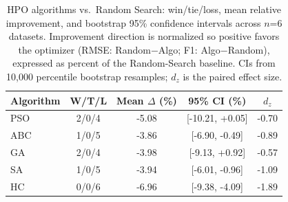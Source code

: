 \begin{table}[!t]
\centering
\caption{HPO algorithms vs.\ Random Search: win/tie/loss, mean relative improvement, and bootstrap 95\% confidence intervals across $n$=6 datasets. Improvement direction is normalized so positive favors the optimizer (RMSE: Random$-$Algo; F1: Algo$-$Random), expressed as percent of the Random-Search baseline. CIs from 10{,}000 percentile bootstrap resamples; $d_z$ is the paired effect size.}
\label{tab:ci_comparison}
\small
\begin{tabular}{lcccc}
\toprule
\textbf{Algorithm} & \textbf{W/T/L} & \textbf{Mean $\Delta$ (\%)} & \textbf{95\% CI (\%)} & \textbf{$d_z$} \\
\midrule
PSO & 2/0/4 & -5.08 & [-10.21, +0.05] & -0.70 \\
ABC & 1/0/5 & -3.86 & [-6.90, -0.49] & -0.89 \\
GA & 2/0/4 & -3.98 & [-9.13, +0.92] & -0.57 \\
SA & 1/0/5 & -3.94 & [-6.01, -0.96] & -1.09 \\
HC & 0/0/6 & -6.96 & [-9.38, -4.09] & -1.89 \\
\bottomrule
\end{tabular}
\end{table}
